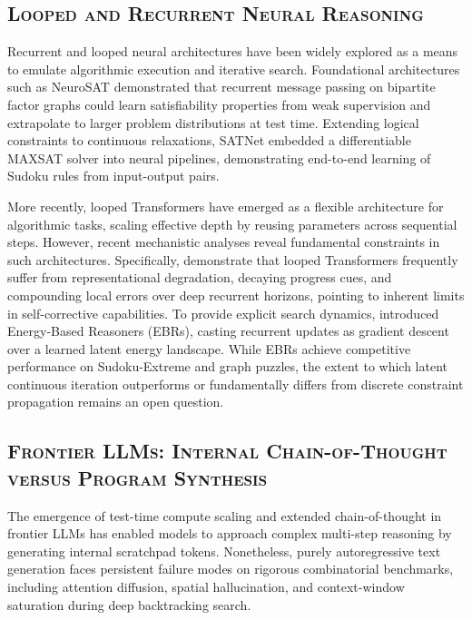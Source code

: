 \documentclass{article} %
\begin{document}
\subsection{\textsc{Looped and Recurrent Neural Reasoning}}
\label{subsec:looped_reasoning}
Recurrent and looped neural architectures have been widely explored as a means to emulate algorithmic execution and iterative search. Foundational architectures such as NeuroSAT \citep{Selsam2018LearningSat} demonstrated that recurrent message passing on bipartite factor graphs could learn satisfiability properties from weak supervision and extrapolate to larger problem distributions at test time. Extending logical constraints to continuous relaxations, SATNet \citep{Wang2019SatnetBridging} embedded a differentiable MAXSAT solver into neural pipelines, demonstrating end-to-end learning of Sudoku rules from input-output pairs. 

More recently, looped Transformers have emerged as a flexible architecture for algorithmic tasks, scaling effective depth by reusing parameters across sequential steps. However, recent mechanistic analyses reveal fundamental constraints in such architectures. Specifically, \citet{Liang2026BeyondTraining} demonstrate that looped Transformers frequently suffer from representational degradation, decaying progress cues, and compounding local errors over deep recurrent horizons, pointing to inherent limits in self-corrective capabilities. To provide explicit search dynamics, \citet{Chen2026EnergybasedReasoners} introduced Energy-Based Reasoners (EBRs), casting recurrent updates as gradient descent over a learned latent energy landscape. While EBRs achieve competitive performance on Sudoku-Extreme and graph puzzles, the extent to which latent continuous iteration outperforms or fundamentally differs from discrete constraint propagation remains an open question.

\subsection{\textsc{Frontier LLMs: Internal Chain-of-Thought versus Program Synthesis}}
\label{subsec:llm_cot_vs_code}
The emergence of test-time compute scaling and extended chain-of-thought in frontier LLMs has enabled models to approach complex multi-step reasoning by generating internal scratchpad tokens. Nonetheless, purely autoregressive text generation faces persistent failure modes on rigorous combinatorial benchmarks, including attention diffusion, spatial hallucination, and context-window saturation during deep backtracking search.
\end{document}
